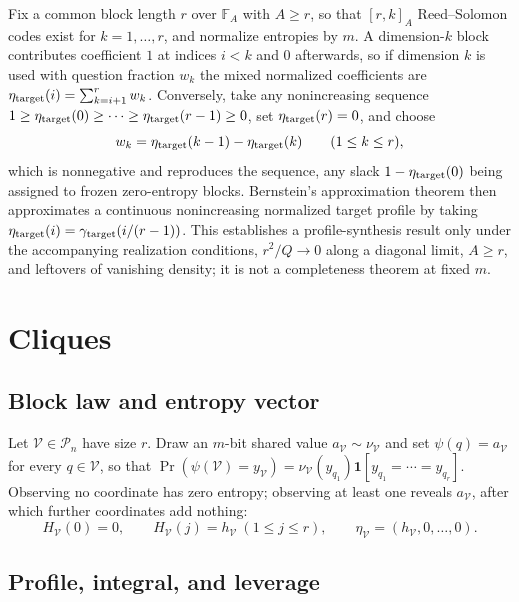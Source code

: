 Fix a common block length $r$ over $\mathbb F_{A}$ with $A \ge r$, so
that $[r,k]_{A}$ Reed--Solomon codes exist for $k = 1,\ldots,r$, and
normalize entropies by $m$. A dimension-$k$ block contributes
coefficient $1$ at indices $i < k$ and $0$ afterwards, so if
dimension $k$ is used with question fraction $w_k$ the mixed
normalized coefficients are
$\eta_{\rm target}(i) = \sum_{k=i+1}^{r}w_k$. Conversely, take any
nonincreasing sequence
$1\ge\eta_{\rm target}(0)\ge\cdots\ge\eta_{\rm target}(r-1)\ge0$, set
$\eta_{\rm target}(r) = 0$, and choose
%
\begin{equation}
  w_k = \eta_{\rm target}(k-1)-\eta_{\rm target}(k)
  \qquad (1\le k\le r),
  \label{eq:appsynth}
\end{equation}
%
which is nonnegative and reproduces the sequence, any slack
$1-\eta_{\rm target}(0)$ being assigned to frozen zero-entropy
blocks. Bernstein's approximation theorem then approximates a
continuous nonincreasing normalized target profile by taking
$\eta_{\rm target}(i) = \gamma_{\rm target}(i/(r-1))$. This
establishes a profile-synthesis result only under the accompanying
realization conditions, $r^2/Q\to0$ along a diagonal limit, $A\ge r$,
and leftovers of vanishing density; it is not a completeness theorem
at fixed $m$.

\section{Cliques}\label{app:cliques}

\subsection{Block law and entropy vector}

Let $\mathcal V\in\mathcal P_n$ have size $r$. Draw an $m$-bit shared
value $a_{\mathcal V}\sim\nu_{\mathcal V}$ and set $\psi(q) =
a_{\mathcal V}$ for every $q\in\mathcal V$, so that
$\Pr(\psi(\mathcal V) = y_{\mathcal V})
= \nu_{\mathcal V}(y_{q_1})\mathbf 1[y_{q_1} = \cdots = y_{q_r}]$.
Observing no coordinate has zero entropy; observing at least one
reveals $a_{\mathcal V}$, after which further coordinates add
nothing:
%
\begin{equation}
  H_{\mathcal V}(0) = 0,
  \qquad
  H_{\mathcal V}(j) = h_{\mathcal V}\ (1\le j\le r),
  \qquad
  \eta_{\mathcal V} = (h_{\mathcal V}, 0, \ldots, 0).
  \label{eq:appcliqueeta}
\end{equation}

\subsection{Profile, integral, and leverage}

